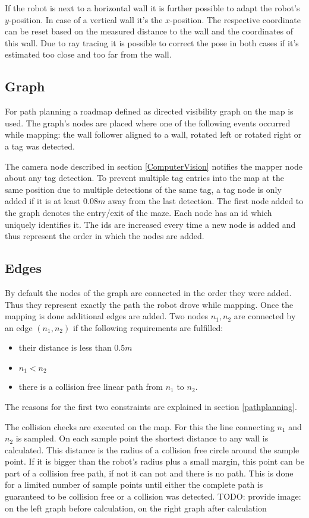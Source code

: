If the robot is next to a horizontal wall it is further possible to adapt the robot's $y$-position. In case of a vertical wall it's the $x$-position.
The respective coordinate can be reset based on the measured distance to the wall and the coordinates of this wall. Due to ray tracing it is possible to correct the pose in both cases if it's estimated too close and too far from the wall.

\subsection{Graph}

For path planning a roadmap defined as directed visibility graph on the map is used. The graph's nodes are placed where one of the following events occurred while mapping: the wall follower aligned to a wall, rotated left or rotated right or a tag was detected. 

The camera node described in section \ref{ComputerVision} notifies the mapper node about any tag detection. To prevent multiple tag entries into the map at the same position due to multiple detections of the same tag, a tag node is only added if it is at least $0.08m$ away from the last detection. 
The first node added to the graph denotes the entry/exit of the maze.
Each node has an id which uniquely identifies it. The ids are increased every time a new node is added and thus represent the order in which the nodes are added.

\subsection{Edges}

By default the nodes of the graph are connected in the order they were added. Thus they represent exactly the path the robot drove while mapping. Once the mapping is done additional edges are added. Two nodes $n_1,n_2$ are connected by an edge $(n_1,n_2)$ if the following requirements are fulfilled:
\begin{itemize}
 \item their distance is less than $0.5m$
 \item $n_1 < n_2$
 \item there is a collision free linear path from $n_1$ to $n_2$.
\end{itemize}

The reasons for the first two constraints are explained in section \ref{pathplanning}. 

The collision checks are executed on the map. For this the line connecting $n_1$ and $n_2$ is sampled. On each sample point the shortest distance to any wall is calculated. This distance is the radius of a collision free circle around the sample point. If it is bigger than the robot's radius plus a small margin, this point can be part of a collision free path, if not it can not and there is no path. This is done for a limited number of sample points until either the complete path is guaranteed to be collision free or a collision was detected.
TODO: provide image: on the left graph before calculation, on the right graph after calculation


